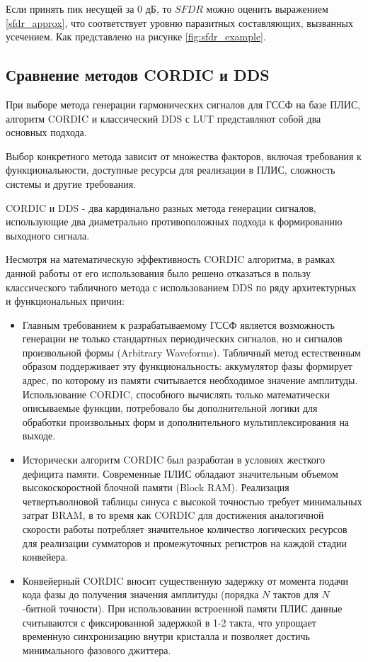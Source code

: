 \documentclass[12pt,a4paper,TimesNewRoman]{article}
\begin{document}
Если принять пик несущей за 0 дБ, то $SFDR$ можно оценить выражением \eqref{sfdr_approx}, что соответствует уровню паразитных составляющих, вызванных усечением. Как представлено на рисунке \ref{fig:sfdr_example}.

\subsection{Сравнение методов CORDIC и DDS}

При выборе метода генерации гармонических сигналов для ГССФ на базе ПЛИС, алгоритм CORDIC и классический DDS с LUT представляют собой два основных подхода.

Выбор конкретного метода зависит от множества факторов, включая требования к функциональности, доступные ресурсы для реализации в ПЛИС, сложность системы и другие требования.

CORDIC и DDS - два кардинально разных метода генерации сигналов, использующие два диаметрально противоположных подхода к формированию выходного сигнала.

Несмотря на математическую эффективность CORDIC алгоритма, в рамках данной работы от его использования было решено отказаться в пользу классического табличного метода с использованием DDS по ряду архитектурных и функциональных причин:

\begin{itemize}
    \item Главным требованием к разрабатываемому ГССФ является возможность генерации не только стандартных периодических сигналов, но и сигналов произвольной формы (Arbitrary Waveforms). Табличный метод естественным образом поддерживает эту функциональность: аккумулятор фазы формирует адрес, по которому из памяти считывается необходимое значение амплитуды. Использование CORDIC, способного вычислять только математически описываемые функции, потребовало бы дополнительной логики для обработки произвольных форм и дополнительного мультиплексирования на выходе.
    \item Исторически алгоритм CORDIC был разработан в условиях жесткого дефицита памяти. Современные ПЛИС обладают значительным объемом высокоскоростной блочной памяти (Block RAM). Реализация четвертьволновой таблицы синуса с высокой точностью требует минимальных затрат BRAM, в то время как CORDIC для достижения аналогичной скорости работы потребляет значительное количество логических ресурсов для реализации сумматоров и промежуточных регистров на каждой стадии конвейера.
    \item Конвейерный CORDIC вносит существенную задержку от момента подачи кода фазы до получения значения амплитуды (порядка $N$ тактов для $N$-битной точности). При использовании встроенной памяти ПЛИС данные считываются с фиксированной задержкой в 1-2 такта, что упрощает временную синхронизацию внутри кристалла и позволяет достичь минимального фазового джиттера.
\end{itemize}
\end{document}
